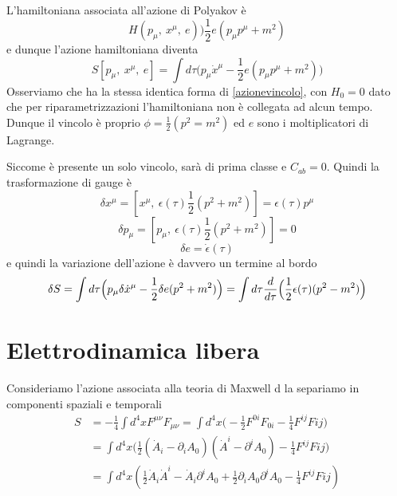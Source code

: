     L'hamiltoniana associata all'azione di Polyakov è 
\begin{equation*}
    H(p_\mu, ~x^\mu, ~e) ) \frac{1}{2} e (p_\mu p^\mu + m^2)
\end{equation*}
    e dunque l'azione hamiltoniana diventa 
\begin{equation*}
    S[p_\mu, ~x^\mu, ~e] = \int d\tau \Big(p_\mu \dot x^\mu - \frac{1}{2} e (p_\mu p^\mu + m^2) \Big)
\end{equation*}
    Osserviamo che ha la stessa identica forma di \eqref{azionevincolo}, con $H_0 = 0$ dato che per riparametrizzazioni l'hamiltoniana non è collegata ad alcun tempo. Dunque il vincolo è proprio $\phi = \frac{1}{2} (p^2 = m^2)$ ed $e$ sono i moltiplicatori di Lagrange. 

    Siccome è presente un solo vincolo, sarà di prima classe e $C_{ab} = 0$. Quindi la trasformazione di gauge è
\begin{equation}
    \delta x^\mu = [x^\mu, ~\epsilon(\tau) \frac{1}{2} (p^2 + m^2)] = \epsilon(\tau) p^\mu
\end{equation}
\begin{equation}
    \delta p_\mu = [p_\mu, ~\epsilon(\tau) \frac{1}{2} (p^2 + m^2)] = 0
\end{equation}
\begin{equation}
    \delta e = \dot \epsilon(\tau)
\end{equation}
    e quindi la variazione dell'azione è davvero un termine al bordo
\begin{equation*}
    \delta S = \int d\tau \Big( p_\mu \delta \dot x^\mu - \frac{1}{2} \delta e (p^2 + m^2)\Big) = \int d\tau \frac{d}{d\tau} \Big (\frac{1}{2} \epsilon(\tau) (p^2 - m^2) \Big)
\end{equation*}

\section{Elettrodinamica libera} 

    Consideriamo l'azione associata alla teoria di Maxwell d la separiamo in componenti spaziali e temporali
\begin{equation*}
\begin{aligned}
    S & = -\frac{1}{4} \int d^4 x F^{\mu\nu} F_{\mu\nu} = \int d^4 x \Big ( -\frac{1}{2} F^{0i}F_{0i} - \frac{1}{4} F^{ij} F{ij} \Big) \\ & = \int d^4 x \Big( \frac{1}{2} (\dot A_i - \partial_i A_0) (\dot A^i - \partial^i A_0) - \frac{1}{4} F^{ij} F{ij} \Big ) \\ & = \int d^4 x (\frac{1}{2} \dot A_i \dot A^i - \dot A_i \partial^i A_0 + \frac{1}{2} \partial_i A_0 \partial^i A_0 - \frac{1}{4} F^{ij} F{ij})
\end{aligned}
\end{equation*}

